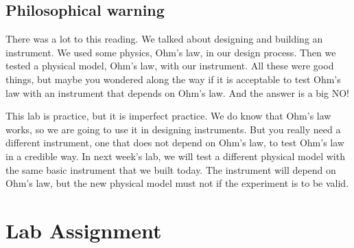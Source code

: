 \subsection{Philosophical warning}

There was a lot to this reading. We talked about designing and building an
instrument. We used some physics, Ohm's law, in our design process. Then we
tested a physical model, Ohm's law, with our instrument. All these were good things, but maybe you wondered along the way if it is acceptable to test Ohm's law with an instrument that depends on Ohm's law. And the answer is a big NO!

This lab is practice, but it is imperfect practice. We do know that Ohm's
law works, so we are going to use it in designing instruments. But you
really need a different instrument, one that does not depend on Ohm's law,
to test Ohm's law in a credible way. In next week's lab, we will test a
different physical model with the same basic instrument that we built today. The instrument will depend on Ohm's law, but the new physical model must not if the experiment is to be valid.




\section{Lab Assignment}

